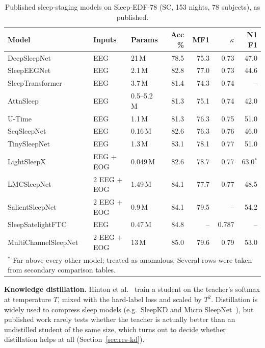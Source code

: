 \begin{table}[htbp]
\centering\small
\caption{Published sleep-staging models on Sleep-EDF-78 (SC, 153 nights, 78 subjects), as published.}
\label{tab:published}
\begin{tabular}{lllrrrr}
\toprule
Model & Inputs & Params & Acc \% & MF1 & $\kappa$ & N1 F1 \\
\midrule
DeepSleepNet~\cite{supratak2017deepsleepnet} & EEG & 21\,M & 78.5 & 75.3 & 0.73 & 47.0 \\
SleepEEGNet~\cite{sleepeegnet} & EEG & 2.1\,M & 82.8 & 77.0 & 0.73 & 44.6 \\
SleepTransformer~\cite{phan2022sleeptransformer} & EEG & 3.7\,M & 81.4 & 74.3 & 0.74 & -- \\
AttnSleep~\cite{eldele2021attnsleep} & EEG & 0.5--5.2\,M & 81.3 & 75.1 & 0.74 & 42.0 \\
U-Time~\cite{perslev2019utime} & EEG & 1.1\,M & 81.3 & 76.3 & 0.75 & 51.0 \\
SeqSleepNet~\cite{phan2019seqsleepnet} & EEG & 0.16\,M & 82.6 & 76.3 & 0.76 & 46.0 \\
TinySleepNet~\cite{supratak2020tinysleepnet} & EEG & 1.3\,M & 83.1 & 78.1 & 0.77 & 51.0 \\
LightSleepX~\cite{lightsleepx} & EEG + EOG & 0.049\,M & 82.6 & 78.7 & 0.77 & 63.0$^{*}$ \\
LMCSleepNet~\cite{lmcsleepnet} & 2 EEG + EOG & 1.49\,M & 84.1 & 77.7 & 0.77 & 48.5 \\
SalientSleepNet~\cite{salientsleepnet} & 2 EEG + EOG & 0.9\,M & 84.1 & 79.5 & -- & 54.2 \\
SleepSatelightFTC~\cite{sleepsatelightftc} & EEG & 0.47\,M & 84.8 & -- & 0.787 & -- \\
MultiChannelSleepNet~\cite{multichannelsleepnet} & 2 EEG + EOG & 13\,M & 85.0 & 79.6 & 0.79 & 53.0 \\
\bottomrule
\multicolumn{7}{l}{\footnotesize $^{*}$ Far above every other model; treated as anomalous. Several rows were taken from secondary comparison tables.}
\end{tabular}
\end{table}

\textbf{Knowledge distillation.} Hinton et al.~\cite{hinton2015distilling} train a student on the teacher's softmax
at temperature $T$, mixed with the hard-label loss and scaled by $T^2$. Distillation is widely used to compress
sleep models (e.g.\ SleepKD and Micro SleepNet~\cite{sleepkd,microsleepnet}), but published work rarely tests
whether the teacher is actually better than an undistilled student of the same size, which turns out to decide
whether distillation helps at all (Section~\ref{sec:res-kd}).

